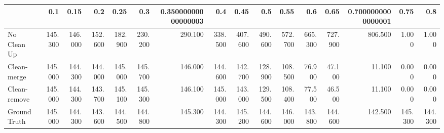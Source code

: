 \begin{tabular}{lrrrrrrrrrrrrrrr}
\toprule
{} &     0.1 &    0.15 &     0.2 &    0.25 &     0.3 & 0.35000000000000003 &     0.4 &    0.45 &     0.5 &    0.55 &     0.6 &    0.65 & 0.7000000000000001 &    0.75 &     0.8 \\
\midrule
No Clean Up  & 145.300 & 146.000 & 152.600 & 182.900 & 230.200 &             290.100 & 338.500 & 407.600 & 490.600 & 572.700 & 665.300 & 727.900 &            806.500 &   1.000 &   1.000 \\
Clean-merge  & 145.000 & 144.300 & 144.000 & 145.000 & 145.700 &             146.000 & 144.600 & 142.700 & 128.900 & 108.500 &  76.900 &  47.100 &             11.100 &   0.000 &   0.000 \\
Clean-remove & 145.000 & 144.300 & 143.700 & 145.100 & 145.300 &             146.100 & 145.000 & 143.000 & 129.500 & 108.400 &  77.500 &  46.500 &             11.100 &   0.000 &   0.000 \\
Ground Truth & 145.000 & 144.300 & 143.600 & 144.500 & 144.800 &             145.300 & 144.300 & 145.200 & 144.600 & 146.000 & 143.800 & 144.600 &            142.500 & 145.300 & 144.300 \\
\bottomrule
\end{tabular}
